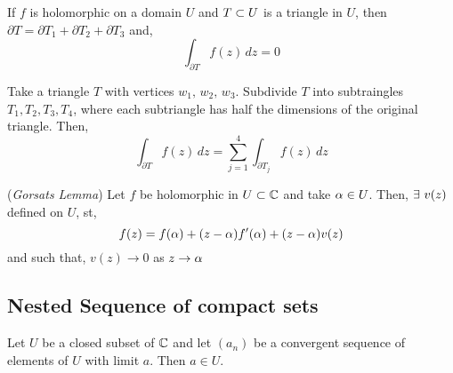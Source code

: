 \documentclass{article}
\begin{document}
\begin{nthm}
  If $f$ is holomorphic on a domain $U$ and $T\subset U$ is a triangle in $U$, then $\partial T = \partial T_1 + \partial T_2 + \partial T_3$ and,
  $$ \int_{\partial T} {f(z)\,dz} = 0$$
\end{nthm}

\begin{nlemma}
  Take a triangle $T$ with vertices $w_1,\, w_2,\, w_3$. Subdivide $T$ into subtraingles $T_1, T_2, T_3, T_4$, where each subtriangle has half the dimensions of the original triangle. Then,
  $$ \int_{\partial T} {f(z)\,dz} = \sum_{j=1}^4 \int_{\partial T_j} f(z)\,dz $$
\end{nlemma}

\begin{figure}[!ht]
  \centering
\end{figure}

\begin{nlemma}{(\textit{Gorsats Lemma})}
  Let $f$ be holomorphic in $U\subset \mathbb{C}$ and take $\alpha \in U$. Then, $\exists\,\, v(z)$ defined on $U$, st,
  $$ f(z) = f(\alpha) + (z-\alpha)f'(\alpha) + (z - \alpha)v(z) $$
  and such that, $\displaystyle{v(z)\to 0}$ as $\displaystyle{z\to \alpha}$
\end{nlemma}

\newpage
\subsection{Nested Sequence of compact sets}
\begin{nlemma}
Let $U$ be a closed subset of $\mathbb{C}$ and let $(a_n)$ be a convergent sequence of elements of $U$ with limit $a$. Then $a\in U$.
\end{nlemma}
\end{document}
